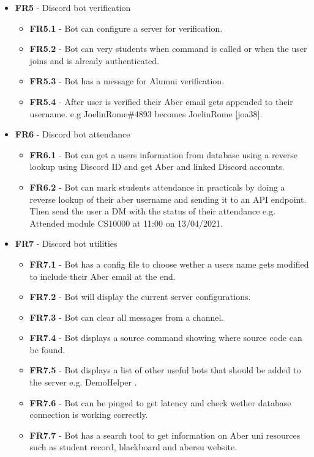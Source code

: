 \begin{itemize}
	\item \textbf{FR5} - Discord bot verification
	\begin{itemize}
		\item \textbf{FR5.1} - Bot can configure a server for verification.
		\item \textbf{FR5.2} - Bot can very students when command is called or when the user joins and is already authenticated.
		\item \textbf{FR5.3} - Bot has a message for Alumni verification.
		\item \textbf{FR5.4} - After user is verified their Aber email gets appended to their username. e.g JoelinRome\#4893 becomes JoelinRome [joa38].
	\end{itemize}

	\item \textbf{FR6} - Discord bot attendance
	\begin{itemize}
		\item \textbf{FR6.1} - Bot can get a users information from database using a reverse lookup using Discord ID and get Aber and linked Discord accounts.
		\item \textbf{FR6.2} - Bot can mark students attendance in practicals by doing a reverse lookup of their aber username and sending it to an API endpoint. Then send the user a DM with the status of their attendance e.g. Attended module CS10000 at 11:00 on 13/04/2021.
	\end{itemize}

	\item \textbf{FR7} - Discord bot utilities
	\begin{itemize}
		\item \textbf{FR7.1} - Bot has a config file to choose wether a users name gets modified to include their Aber email at the end.
		\item \textbf{FR7.2} - Bot will display the current server configurations.
		\item \textbf{FR7.3} - Bot can clear all messages from a channel.
		\item \textbf{FR7.4} - Bot displays a source command showing where source code can be found.
		\item \textbf{FR7.5} - Bot displays a list of other useful bots that should be added to the server e.g. DemoHelper \cite{demohelper}.
		\item \textbf{FR7.6} - Bot can be pinged to get latency and check wether database connection is working correctly.
		\item \textbf{FR7.7} - Bot has a search tool to get information on Aber uni resources such as student record, blackboard and abersu website. 
	\end{itemize}


\end{itemize}
